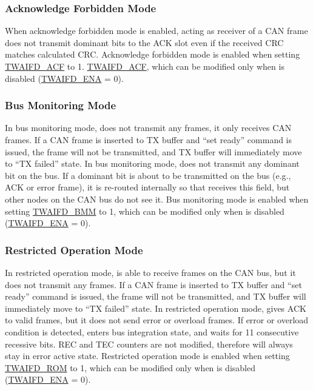 \documentclass[main\_\_EN.tex]{subfiles}
\begin{document}
\subsubsection{Acknowledge Forbidden Mode}

When acknowledge forbidden mode is enabled, \modulename{} acting as receiver of a CAN frame does not transmit dominant bits to the ACK slot even if the received CRC matches calculated CRC. Acknowledge forbidden mode is enabled when  setting \hyperref[fielddesc:TWAIFDACF]{TWAIFD\_ACF} to 1. \hyperref[fielddesc:TWAIFDACF]{TWAIFD\_ACF}, which can be modified only when \modulename{} is disabled (\hyperref[fielddesc:TWAIFDENA]{TWAIFD\_ENA} = 0).



\subsubsection{Bus Monitoring Mode}

In bus monitoring mode, \modulename{} does not transmit any frames, it only receives CAN frames. If a CAN frame is inserted to TX buffer and ``set ready'' command is issued, the frame will not be transmitted, and TX buffer will immediately move to ``TX failed'' state. In bus monitoring mode, \modulename{} does not transmit any dominant bit on the bus. If a dominant bit is about to be transmitted on the bus (e.g., ACK or error frame), it is re-routed internally so that \modulename{} receives this field, but other nodes on the CAN bus do not see it. Bus monitoring mode is enabled when setting \hyperref[fielddesc:TWAIFDBMM]{TWAIFD\_BMM} to 1, which can be modified only when \modulename{} is disabled (\hyperref[fielddesc:TWAIFDENA]{TWAIFD\_ENA} = 0).

\subsubsection{Restricted Operation Mode}

In restricted operation mode, \modulename{} is able to receive frames on the CAN bus, but it does not transmit any frames. If a CAN frame is inserted to TX buffer and ``set ready'' command is issued, the frame will not be transmitted, and TX buffer will immediately move to ``TX failed'' state. In restricted operation mode, \modulename{} gives ACK to valid frames, but it does not send error or overload frames. If error or overload condition is detected, \modulename{} enters bus integration state, and waits for 11 consecutive recessive bits. REC and TEC counters are not modified, therefore \modulename{} will always stay in error active state. Restricted operation mode is enabled when setting \hyperref[fielddesc:TWAIFDROM]{TWAIFD\_ROM} to 1, which can be modified only when \modulename{} is disabled (\hyperref[fielddesc:TWAIFDENA]{TWAIFD\_ENA} = 0).
\end{document}

